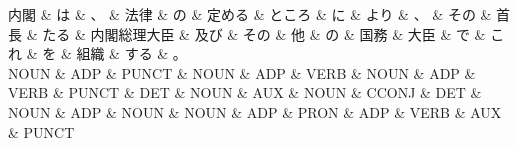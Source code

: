 \documentclass[tikz,border=5pt]{standalone}
\begin{document}
\normalsize
\begin{dependency}[edge unit distance=10.9pt]
    \begin{deptext}[column sep=1em]
        内閣 \& は \& 、 \& 法律 \& の \& 定める \& ところ \& に \& より \& 、 \& その \& 首長 \& たる \& 内閣総理大臣 \& 及び \& その \& 他 \& の \& 国務 \& 大臣 \& で \& これ \& を \& 組織 \& する \& 。\\
        NOUN \& ADP \& PUNCT \& NOUN \& ADP \& VERB \& NOUN \& ADP \& VERB \& PUNCT \& DET \& NOUN \& AUX \& NOUN \& CCONJ \& DET \& NOUN \& ADP \& NOUN \& NOUN \& ADP \& PRON \& ADP \& VERB \& AUX \& PUNCT\\
    \end{deptext}
\end{dependency}
\end{document}
